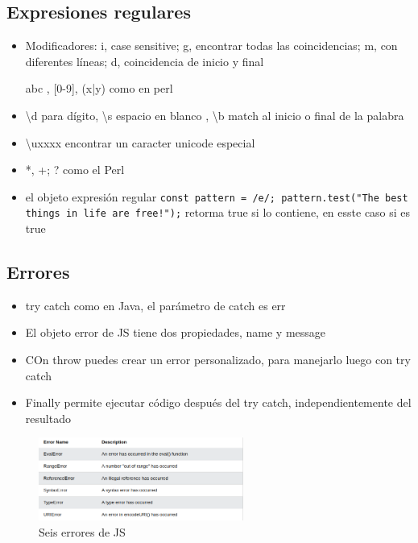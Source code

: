 \documentclass{article}
\begin{document}
 \subsection{Expresiones regulares}

 \begin{itemize}
   \item Modificadores: i, case sensitive; g, encontrar todas las coincidencias; m, con diferentes líneas; d, coincidencia de inicio y final
   \item [abc], [0-9], (x|y) como en perl
   \item {\textbackslash}d para dígito, {\textbackslash}s espacio en blanco , {\textbackslash}b match al inicio o final de la palabra
   \item {\textbackslash}uxxxx encontrar un caracter unicode especial
   \item *, +; ? como el Perl
   \item el objeto expresión regular \lstinline{const pattern = /e/; pattern.test("The best things in life are free!");} retorma true si lo contiene, en esste caso si es true
 \end{itemize}

 \subsection{Errores}
 \begin{itemize}
   \item try catch como en Java, el parámetro de catch es err
   \item El objeto error de  JS tiene dos propiedades, name y message
   \item COn throw puedes crear un error personalizado, para manejarlo luego con try catch
   \item Finally permite ejecutar código después del try catch, independientemente del resultado
 \end{itemize}

 \begin{figure}[H]
   \centering
   \includegraphics[width=0.6\textwidth]{table10.png}
   \caption{Seis errores de JS}
 \end{figure}
\end{document}

